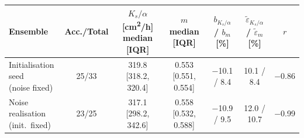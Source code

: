 {\renewcommand{\arraystretch}{1.15}\setlength{\tabcolsep}{4pt}
\begin{tabular}{l c c c c c c}
\toprule
Ensemble & Acc./Total & \makecell{$K_s/\alpha$ [\si{cm^2/h}]\\median [IQR]} & \makecell{$m$\\median [IQR]} & \makecell{$b_{K_s/\alpha}$ / $b_{m}$\\{[\%]}} & \makecell{$\tilde\varepsilon_{K_s/\alpha}$ / $\tilde\varepsilon_{m}$\\{[\%]}} & $r$ \\
\midrule
\makecell[l]{Initialisation seed\\(noise fixed)} & 25/33 & \makecell{\num{319.8}\\{[\num{318.2}, \num{320.4}]}} & \makecell{\num{0.553}\\{[\num{0.551}, \num{0.554}]}} & \num[retain-explicit-plus]{-10.1} / \num[retain-explicit-plus]{+8.4} & \num{10.1} / \num{8.4} & \num{-0.86} \\
\makecell[l]{Noise realisation\\(init.\ fixed)} & 23/25 & \makecell{\num{317.1}\\{[\num{298.2}, \num{342.6}]}} & \makecell{\num{0.558}\\{[\num{0.532}, \num{0.588}]}} & \num[retain-explicit-plus]{-10.9} / \num[retain-explicit-plus]{+9.5} & \num{12.0} / \num{10.7} & \num{-0.99} \\
\bottomrule
\end{tabular}}
